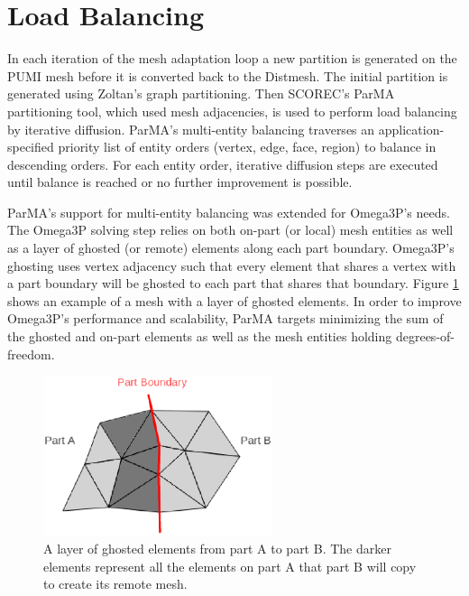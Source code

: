 \documentclass[review,12pt]{elsarticle_summary_report}
\begin{document}



\section{\label{load_balance}Load Balancing}
In each iteration of the mesh adaptation loop a new partition is generated on the
PUMI mesh before it is converted back to the Distmesh. The initial partition is generated
using Zoltan's graph partitioning. Then SCOREC's ParMA partitioning tool, which used mesh adjacencies, is used to perform load balancing by iterative diffusion. ParMA's multi-entity balancing
traverses an application-specified priority list of entity orders (vertex, edge, face,
region) to balance in descending orders.
For each entity order, iterative diffusion steps are executed until balance is reached
or no further improvement is possible.

ParMA's support for multi-entity balancing was extended for Omega3P's needs.
The Omega3P solving step relies on both on-part (or local) mesh entities as well as a layer
of ghosted (or remote) elements along each part boundary.
Omega3P's ghosting uses vertex adjacency such that every element that shares a
vertex with a part boundary will be ghosted to each part that shares that
boundary.
Figure \ref{fig:ghost3} shows an example of a mesh with
a layer of ghosted elements.
In order to improve Omega3P's performance and scalability, ParMA targets
minimizing the sum of the ghosted and on-part elements as well as the mesh
entities holding degrees-of-freedom.

\begin{figure}[!ph]
\centering
\includegraphics[width=0.6\textwidth]{ghost.eps} 
\caption{\label{fig:ghost3} A layer of ghosted elements from part A to part B. The darker elements represent all the elements on part A that part B will copy to create its remote mesh.}
\end{figure}
\end{document}
